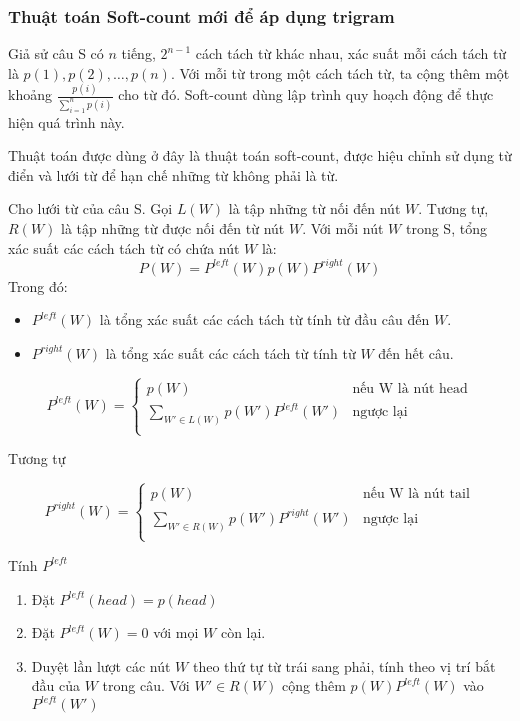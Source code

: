 \documentclass[a4paper,oneside,14pt]{extbook} %
\begin{document}
\subsubsection{Thuật toán Soft-count mới để áp dụng trigram}



Giả sử câu S có $n$ tiếng, $2^{n-1}$ cách tách từ khác nhau, xác suất
mỗi cách tách từ là $p(1),p(2),\ldots{},p(n)$.
Với mỗi từ trong một cách tách từ, ta cộng thêm một khoảng
$\displaystyle\frac{p(i)}{\sum_{i=1}^n{p(i)}}$ cho từ đó. Soft-count dùng
lập trình quy hoạch động để thực hiện quá trình này.

Thuật toán được dùng ở đây là thuật toán soft-count, được hiệu chỉnh
sử dụng từ điển và lưới từ để hạn chế những từ không phải là từ.

Cho lưới từ của câu S. Gọi $L(W)$ là tập những từ nối đến nút
$W$. Tương tự, $R(W)$ là tập những từ được nối đến từ nút $W$.
Với mỗi nút $W$ trong S, tổng xác suất các cách tách từ có chứa nút
$W$ là:
$$P(W)=P^{left}(W)p(W)P^{right}(W)$$
Trong đó:
\begin{itemize}
\item $P^{left}(W)$ là tổng xác suất các cách tách từ tính từ đầu câu
  đến $W$.
\item $P^{right}(W)$ là tổng xác suất các cách tách từ tính từ $W$ đến
  hết câu.
\end{itemize}

$$
P^{left}(W) = \left\{
    \begin{array}{ll}
      p(W)&\text{nếu W là nút head}\\
      \displaystyle\sum_{W' \in L(W)}p(W')P^{left}(W')&\text{ngược lại}\\
    \end{array}
  \right.
$$

Tương tự

$$
P^{right}(W) = \left\{
    \begin{array}{ll}
      p(W)&\text{nếu W là nút tail}\\
      \displaystyle\sum_{W' \in R(W)}p(W')P^{right}(W')&\text{ngược lại}\\
    \end{array}
  \right.
$$

\begin{algo}\caption{Tính $P^{left}$}
\begin{enumerate}
\item Đặt $P^{left}(head) = p(head)$
\item Đặt $P^{left}(W) = 0$ với mọi $W$ còn lại.
\item Duyệt lần lượt các nút $W$ theo thứ tự từ trái sang phải, tính
  theo vị trí bắt đầu của $W$ trong câu. Với $W' \in R(W)$
  cộng thêm $p(W)P^{left}(W)$ vào $P^{left}(W')$
\end{enumerate}
\end{algo}
\end{document}
